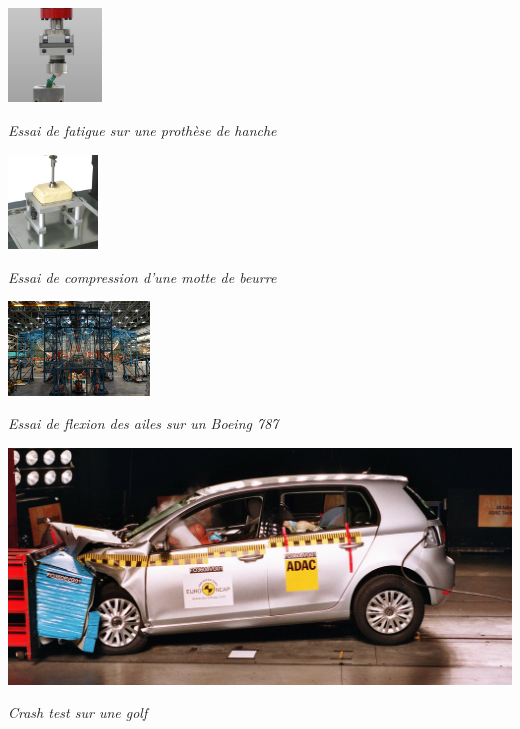\documentclass[11pt,oneside]{article}
\begin{document}
\begin{minipage}[c]{.2\linewidth}
\begin{center}
\includegraphics[height=2.5cm]{png/zwick_1}

\textit{Essai de fatigue sur une prothèse de hanche \cite{zwick}}
\end{center}
\end{minipage} \hfill
\begin{minipage}[c]{.2\linewidth}
\begin{center}
\includegraphics[height=2.5cm]{png/zwick_2}

\textit{Essai de compression d'une motte de beurre \cite{zwick}}
\end{center}
\end{minipage} \hfill
\begin{minipage}[c]{.2\linewidth}
\begin{center}
\includegraphics[height=2.5cm]{png/787_p}

\textit{Essai de flexion des ailes sur un Boeing 787}
\end{center}
\end{minipage} \hfill
\begin{minipage}[c]{.2\linewidth}
\begin{center}
\includegraphics[width=.9\textwidth]{png/crash.png}

\textit{Crash test sur une golf}
\end{center}
\end{minipage}
\end{document}
